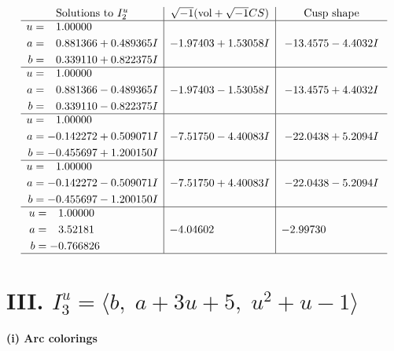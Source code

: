 \documentclass[1p]{elsarticle_modified}
\theoremstyle{definition}
\newcommand{\I}{\sqrt{-1}}
\begin{document}
$$\begin{array}{c|c|c}  
\text{Solutions to }I^u_{2}& \I (\text{vol} + \sqrt{-1}CS) & \text{Cusp shape}\\
 \hline 
\begin{aligned}
u &= \phantom{-}1.00000\phantom{ +0.000000I} \\
a &= \phantom{-}0.881366 + 0.489365 I \\
b &= \phantom{-}0.339110 + 0.822375 I\end{aligned}
 & -1.97403 + 1.53058 I & -13.4575 - 4.4032 I \\ \hline\begin{aligned}
u &= \phantom{-}1.00000\phantom{ +0.000000I} \\
a &= \phantom{-}0.881366 - 0.489365 I \\
b &= \phantom{-}0.339110 - 0.822375 I\end{aligned}
 & -1.97403 - 1.53058 I & -13.4575 + 4.4032 I \\ \hline\begin{aligned}
u &= \phantom{-}1.00000\phantom{ +0.000000I} \\
a &= -0.142272 + 0.509071 I \\
b &= -0.455697 + 1.200150 I\end{aligned}
 & -7.51750 - 4.40083 I & -22.0438 + 5.2094 I \\ \hline\begin{aligned}
u &= \phantom{-}1.00000\phantom{ +0.000000I} \\
a &= -0.142272 - 0.509071 I \\
b &= -0.455697 - 1.200150 I\end{aligned}
 & -7.51750 + 4.40083 I & -22.0438 - 5.2094 I \\ \hline\begin{aligned}
u &= \phantom{-}1.00000\phantom{ +0.000000I} \\
a &= \phantom{-}3.52181\phantom{ +0.000000I} \\
b &= -0.766826\phantom{ +0.000000I}\end{aligned}
 & -4.04602\phantom{ +0.000000I} & -2.99730\phantom{ +0.000000I}\\
 \hline 
 \end{array}$$\newpage\newpage\renewcommand{\arraystretch}{1}
\centering \section*{III. $I^u_{3}= \langle b,\;a+3 u+5,\;u^2+u-1 \rangle$}
\flushleft \textbf{(i) Arc colorings}\\
\end{document}
